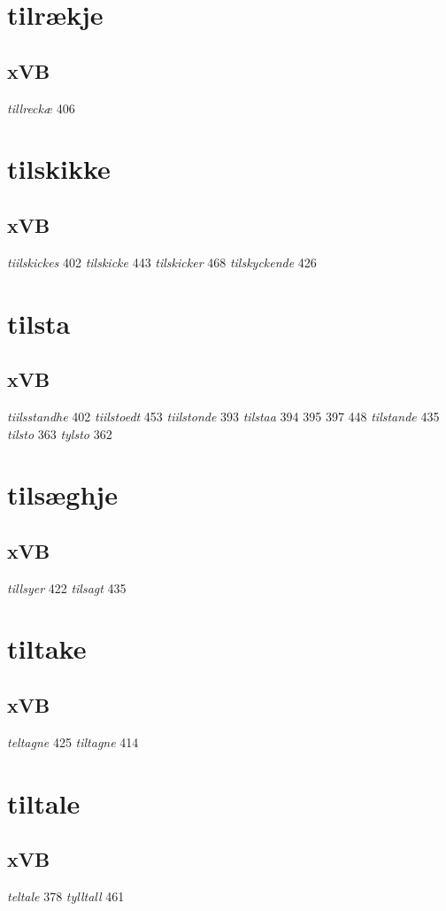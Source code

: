 \documentclass[a4paper,twocolumn]{article}
\begin{document}
\section{tilrækje}
\label{sec:orgb47fc7c}
\subsection{xVB}
\label{sec:orgf87a637}
\emph{tillreckæ} 406 
\section{tilskikke}
\label{sec:orgf54c726}
\subsection{xVB}
\label{sec:orgdeadc73}
\emph{tiilskickes} 402 \emph{tilskicke} 443 \emph{tilskicker} 468 \emph{tilskyckende} 426 
\section{tilsta}
\label{sec:org6558daa}
\subsection{xVB}
\label{sec:org17b7134}
\emph{tiilsstandhe} 402 \emph{tiilstoedt} 453 \emph{tiilstonde} 393 \emph{tilstaa} 394 395 397 448 \emph{tilstande} 435 \emph{tilsto} 363 \emph{tylsto} 362 
\section{tilsæghje}
\label{sec:orgb655bb1}
\subsection{xVB}
\label{sec:org04fa8e3}
\emph{tillsyer} 422 \emph{tilsagt} 435 
\section{tiltake}
\label{sec:org04d2e78}
\subsection{xVB}
\label{sec:org18ed91f}
\emph{teltagne} 425 \emph{tiltagne} 414 
\section{tiltale}
\label{sec:org24e0ca6}
\subsection{xVB}
\label{sec:org80829bc}
\emph{teltale} 378 \emph{tylltall} 461 
\end{document}
